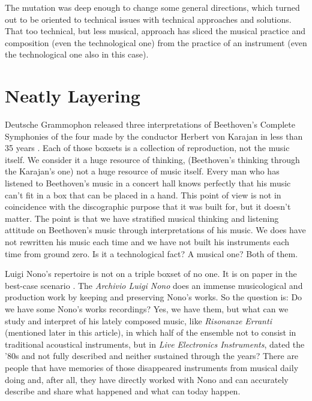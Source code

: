 \documentclass[twoside,a4paper]{article}
\begin{document}
The mutation was deep enough to change some general directions, which turned out to be oriented to technical issues with technical approaches and solutions. That too technical, but less musical, approach has sliced the musical practice and composition (even the technological one) from the practice of an instrument (even the technological one also in this case).


\section{Neatly Layering}
\label{sec:layering}

Deutsche Grammophon released three interpretations of Beethoven's Complete Symphonies of the four made by the conductor Herbert von Karajan in less than 35 years \cite{rrrnyt}. Each of those boxsets is a collection of reproduction, not the music itself. We consider it a huge resource of thinking, (Beethoven's thinking through the Karajan's one) not a huge resource of music itself. Every man who has listened to Beethoven's music in a concert hall knows perfectly that his music can't fit in a box that can be placed in a hand. This point of view is not in coincidence with the discographic purpose that it was built for, but it doesn't matter. The point is that we have stratified musical thinking and listening attitude on Beethoven's music through interpretations of his music. We does have not rewritten his music each time and we have not built his instruments each time from ground zero. Is it a technological fact? A musical one? Both of them.

Luigi Nono's repertoire is not on a triple boxset of no one. It is on paper in the best-case scenario \cite{raprmt}. The \emph{Archivio Luigi Nono} does an immense musicological and production work by keeping and preserving Nono's works. So the question is: Do we have some Nono's works recordings? Yes, we have them, but what can we study and interpret of his lately composed music, like \emph{Risonanze Erranti} (mentioned later in this article), in which half of the ensemble not to consist in traditional acoustical instruments, but in \emph{Live Electronics Instruments}, dated the '80s and not fully described and neither sustained through the years? There are people that have memories of those disappeared instruments from musical daily doing and, after all, they have directly worked with Nono and can accurately describe and share what happened and what can today happen.
\end{document}
